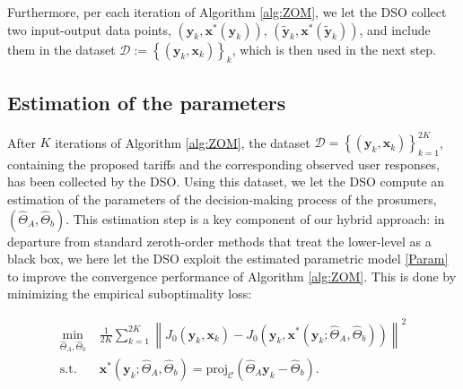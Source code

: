 \documentclass[letterpaper, 10 pt, conference]{ieeeconf}
\newcommand\xbf{\mathbf{x}}
\newcommand\ybf{\mathbf{y}}
\begin{document}
Furthermore, per each iteration of Algorithm \ref{alg:ZOM}, we let the DSO collect two input-output data points, $\left(\ybf_k,\xbf^*(\ybf_k)\right)$, $\left(\tilde{\ybf}_k,\xbf^*(\tilde{\ybf}_k)\right)$, and include them in the dataset $\mathcal{D}:=\left\{(\ybf_k, \xbf_k)\right\}_k$, which is then used in the next step. 
\subsection{Estimation of the parameters}
After $K$ iterations of Algorithm \ref{alg:ZOM}, the dataset $\mathcal{D=}\left\{\left(\ybf_k, \xbf_k\right)\right\}_{k=1}^{2K}$, containing the proposed tariffs and the corresponding observed user responses, has been collected by the DSO. Using this dataset, we let the DSO compute an estimation of the parameters of the decision-making process of the prosumers, $(\hat{\Theta}_A, \hat{\Theta}_b)$. This estimation step is a key component of our hybrid approach: in departure from standard zeroth-order methods that treat the lower-level as a black box, we here let the DSO exploit the estimated parametric model \eqref{Param} to improve the convergence performance of Algorithm \ref{alg:ZOM}. This is done by minimizing the empirical suboptimality loss:

\begin{align}\label{Loss}
    \min\limits_{\hat{\Theta}_A, \hat{\Theta}_b} & \frac{1}{2K}\sum_{k=1}^{2K}{\left\|J_0(\ybf_k, \xbf_k)-J_0(\ybf_k,\xbf^*(\ybf_k;\hat{\Theta}_A, \hat{\Theta}_b))\right\|^2}\\
    \text{s.t.} \quad &\xbf^*(\ybf_k; \hat{\Theta}_A, \hat{\Theta}_b)=\mathrm{proj}_\mathcal{C}(\hat{\Theta}_A\ybf_k-\hat{\Theta}_b).\nonumber
\end{align}
\end{document}
